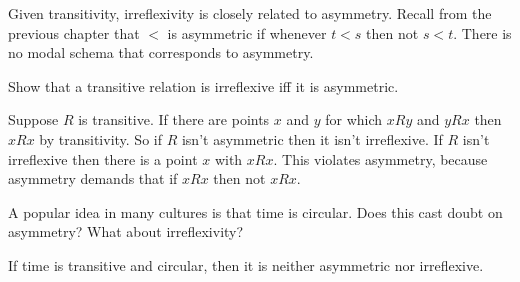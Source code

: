 


Given transitivity, irreflexivity is closely related to asymmetry. Recall from
the previous chapter that $<$ is asymmetric if whenever $t<s$ then not $s<t$.
There is no modal schema that corresponds to asymmetry.

\begin{exercise}\label{ex:partialorder}
  Show that a transitive relation is irreflexive iff it is asymmetric.
\end{exercise}
\begin{solution}
  Suppose $R$ is transitive. If there are points $x$ and $y$ for which $xRy$ and
  $yRx$ then $xRx$ by transitivity. So if $R$ isn't asymmetric then it isn't
  irreflexive. If $R$ isn't irreflexive then there is a point $x$ with $xRx$.
  This violates asymmetry, because asymmetry demands that if $xRx$ then not
  $xRx$.
\end{solution}

\begin{exercise}
  A popular idea in many cultures is that time is circular. Does this
  cast doubt on asymmetry? What about irreflexivity? 
\end{exercise}
\begin{solution}
  If time is transitive and circular, then it is neither asymmetric nor
  irreflexive.
\end{solution}

